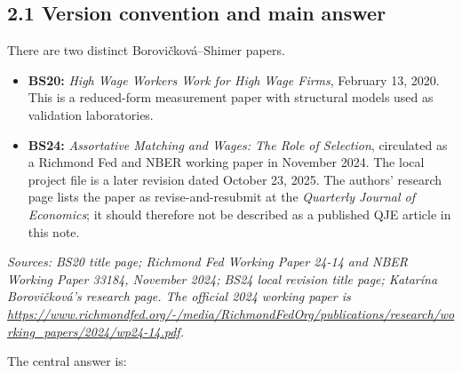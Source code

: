 \documentclass[11pt]{article}
\begin{document}
\subsection{2.1 Version convention and main answer}

There are two distinct Borovi\v{c}kov\'a--Shimer papers.

\begin{itemize}
\item \textbf{BS20:} \emph{High Wage Workers Work for High Wage Firms},
  February 13, 2020.  This is a reduced-form measurement paper with structural
  models used as validation laboratories.
\item \textbf{BS24:} \emph{Assortative Matching and Wages: The Role of
  Selection}, circulated as a Richmond Fed and NBER working paper in November
  2024.  The local project file is a later revision dated October 23, 2025.
  The authors' research page lists the paper as revise-and-resubmit at the
  \emph{Quarterly Journal of Economics}; it should therefore not be described
  as a published QJE article in this note.
\end{itemize}

\textit{Sources: BS20 title page; Richmond Fed Working Paper 24-14 and NBER
Working Paper 33184, November 2024; BS24 local revision title page; Katar\'ina
Borovi\v{c}kov\'a's research page.  The official 2024 working paper is
\url{https://www.richmondfed.org/-/media/RichmondFedOrg/publications/research/working_papers/2024/wp24-14.pdf}.}

The central answer is:
\end{document}
